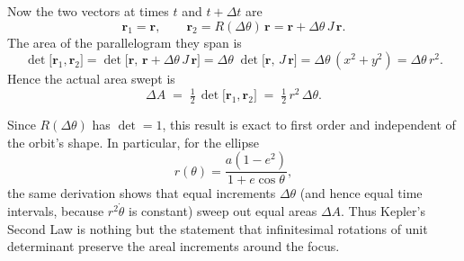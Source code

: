 Now the two vectors at times \(t\) and \(t+\Delta t\) are
\[
\mathbf{r}_1 = \mathbf{r}, 
\qquad
\mathbf{r}_2 = R(\Delta\theta)\,\mathbf{r} = \mathbf{r} + \Delta\theta\,J\,\mathbf{r}.
\]
The area of the parallelogram they span is
\[
\det\bigl[\mathbf{r}_1,\mathbf{r}_2\bigr]
= \det\bigl[\mathbf{r},\,\mathbf{r} + \Delta\theta\,J\,\mathbf{r}\bigr]
= \Delta\theta \;\det\bigl[\mathbf{r},\,J\,\mathbf{r}\bigr]
= \Delta\theta\,(x^2+y^2)
= \Delta\theta\,r^2.
\]
Hence the actual area swept is
\[
\Delta A \;=\;\tfrac12\,\det\bigl[\mathbf{r}_1,\mathbf{r}_2\bigr]
\;=\;\tfrac12\,r^2\,\Delta\theta.
\]

Since \(R(\Delta\theta)\) has \(\det=1\), this result is exact to first order and independent of the orbit’s shape.  In particular, for the ellipse
\[
r(\theta)
=\frac{a(1-e^2)}{1+e\cos\theta},
\]
the same derivation shows that equal increments \(\Delta\theta\) (and hence equal time intervals, because \(r^2\dot\theta\) is constant) sweep out equal areas \(\Delta A\).  Thus Kepler’s Second Law is nothing but the statement that infinitesimal rotations of unit determinant preserve the areal increments around the focus.


